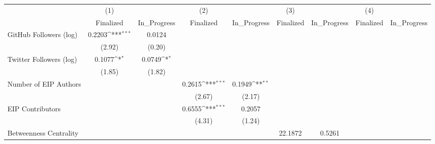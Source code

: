 {
\def\sym#1{\ifmmode^{#1}\else\(^{#1}\)\fi}
\begin{tabular}{l*{8}{c}}
\hline\hline
                                   &\multicolumn{1}{c}{(1)}         &                   &\multicolumn{1}{c}{(2)}         &                   &\multicolumn{1}{c}{(3)}         &                   &\multicolumn{1}{c}{(4)}         &                   \\
                                   & Finalized         &In\_Progress         & Finalized         &In\_Progress         & Finalized         &In\_Progress         & Finalized         &In\_Progress         \\
\hline
GitHub Followers (log)             &    0.2203\sym{***}&    0.0124         &                   &                   &                   &                   &                   &                   \\
                                   &    (2.92)         &    (0.20)         &                   &                   &                   &                   &                   &                   \\
[1em]
Twitter Followers (log)            &    0.1077\sym{*}  &    0.0749\sym{*}  &                   &                   &                   &                   &                   &                   \\
                                   &    (1.85)         &    (1.82)         &                   &                   &                   &                   &                   &                   \\
[1em]
Number of EIP Authors              &                   &                   &    0.2615\sym{***}&    0.1949\sym{**} &                   &                   &                   &                   \\
                                   &                   &                   &    (2.67)         &    (2.17)         &                   &                   &                   &                   \\
[1em]
EIP Contributors                   &                   &                   &    0.6555\sym{***}&    0.2057         &                   &                   &                   &                   \\
                                   &                   &                   &    (4.31)         &    (1.24)         &                   &                   &                   &                   \\
[1em]
Betweenness Centrality             &                   &                   &                   &                   &   22.1872         &    0.5261         &                   &                   \\

\end{tabular}}
